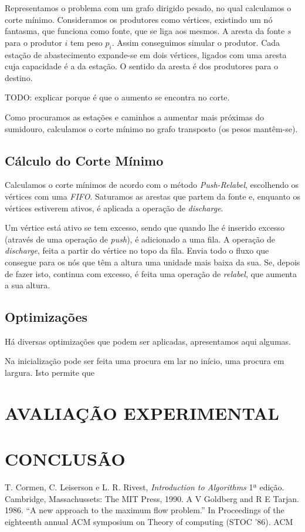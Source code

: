 \documentclass[a4paper, 12pt, conference, portuguese]{ieeeconf}
\begin{document}
Representamos o problema com um grafo dirigido pesado, no qual
calculamos o corte mínimo. Consideramos os produtores como
vértices, existindo um nó fantasma, que funciona como fonte, que
se liga aos mesmos. A aresta da fonte $s$ para o produtor $i$ tem
peso $p_i$. Assim conseguimos simular o produtor. Cada estação de
abastecimento expande-se em dois vértices, ligados com uma aresta
cuja capacidade é a da estação. O sentido da aresta é dos produtores
para o destino.

TODO: explicar porque é que o aumento se encontra no corte.

Como procuramos as estações e caminhos a aumentar mais próximas
do sumidouro, calculamos o corte mínimo no grafo transposto (os
pesos mantêm-se).

\subsection{Cálculo do Corte Mínimo}
Calculamos o corte mínimos de acordo com o método
\textit{Push-Relabel}\cite{pre-flow}, escolhendo os vértices com
uma \textit{FIFO}. Saturamos as arestas que
partem da fonte e, enquanto os vértices estiverem ativos, é
aplicada a operação de \textit{discharge}.

Um vértice está ativo se tem excesso, sendo que quando lhe é
inserido excesso (através de uma operação de \textit{push}), é adicionado
a uma fila. A operação de \textit{discharge}, feita a partir do vértice
no topo da fila. Envia todo o fluxo que consegue para os nós que
têm a altura uma unidade mais baixa da sua. Se, depois de fazer
isto, continua com excesso, é feita uma operação de
\textit{relabel}, que aumenta a sua altura.

\subsection{Optimizações}

Há diversas optimizações que podem ser aplicadas, apresentamos
aqui algumas.

Na inicialização pode ser feita uma procura em lar
no início, uma procura em largura. Isto permite que

\section{AVALIAÇÃO EXPERIMENTAL}\label{experimental}

\section{CONCLUSÃO}\label{conclusion}


\begin{thebibliography}{99}
   T. Cormen, C. Leiserson e L. R. Rivest, \textit{Introduction
    to Algorithms} 1ª edição. Cambridge, Massachussets: The MIT Press,
    1990.
    A V Goldberg and R E Tarjan. 1986.
    ``A new approach to the maximum flow problem.''
    In Proceedings of the eighteenth annual ACM symposium on Theory of computing (STOC '86). ACM
\end{thebibliography}
\end{document}
